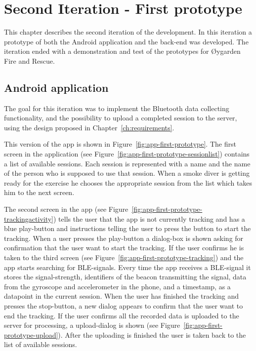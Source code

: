 \documentclass[../Main/thesis.tex]{subfiles}
\begin{document}
\chapter{Second Iteration  - First prototype}
\label{ch:development-1}
This chapter describes the second iteration of the development.
In this iteration a prototype of both the Android application and the back-end was developed.
The iteration ended with a demonstration and test of the prototypes for Øygarden Fire and Rescue.

\section{Android application}
The goal for this iteration was to implement the Bluetooth data collecting functionality, and the possibility to upload a completed session to the server, using the design proposed in Chapter~\ref{ch:requirements}.

This version of the app is shown in Figure~\ref{fig:app-first-prototype}.
The first screen in the application (see Figure~\ref{fig:app-first-prototype-sessionlist}) contains a list of available sessions. 
Each session is represented with a name and the name of the person who is supposed to use that session.
When a smoke diver is getting ready for the exercise he chooses the appropriate session from the list which takes him to the next screen.

The second screen in the app (see Figure~\ref{fig:app-first-prototype-trackingactivity}) tells the user that the app is not currently tracking and has a blue play-button and instructions telling the user to press the button to start the tracking.
When a user presses the play-button a dialog-box is shown asking for confirmation that the user want to start the tracking. 
If the user confirms he is taken to the third screen (see Figure~\ref{fig:app-first-prototype-tracking}) and the app starts searching for BLE-signals.
Every time the app receives a BLE-signal it stores the signal-strength, identifiers of the beacon transmitting the signal, data from the gyroscope and accelerometer in the phone, and a timestamp, as a datapoint in the current session.
When the user has finished the tracking and presses the stop-button, a new dialog appears to confirm that the user want to end the tracking.
If the user confirms all the recorded data is uploaded to the server for processing, a upload-dialog is shown (see Figure~\ref{fig:app-first-prototype-upload}).
After the uploading is finished the user is taken back to the list of available sessions.
\end{document}

